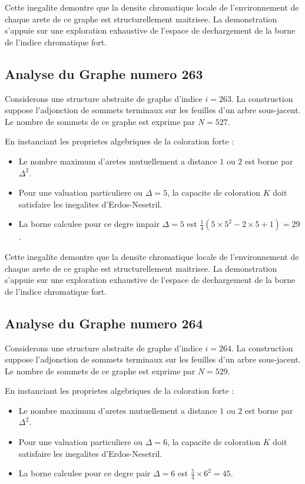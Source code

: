 \documentclass[11pt,a4paper]{article}
\begin{document}
Cette inegalite demontre que la densite chromatique locale de l'environnement de chaque arete de ce graphe est structurellement maitrisee. La demonstration s'appuie sur une exploration exhaustive de l'espace de dechargement de la borne de l'indice chromatique fort.

\subsection{Analyse du Graphe numero 263}
Considerons une structure abstraite de graphe d'indice $i = 263$. La construction suppose l'adjonction de sommets terminaux sur les feuilles d'un arbre sous-jacent. Le nombre de sommets de ce graphe est exprime par $N = 527$.

En instanciant les proprietes algebriques de la coloration forte :
\begin{itemize}
\item Le nombre maximum d'aretes mutuellement a distance $1$ ou $2$ est borne par $\Delta^2$.
\item Pour une valuation particuliere ou $\Delta = 5$, la capacite de coloration $K$ doit satisfaire les inegalites d'Erdos-Nesetril.
\item La borne calculee pour ce degre impair $\Delta = 5$ est $\frac{1}{4}(5 \times 5^2 - 2 \times 5 + 1) = 29$.
\end{itemize}

Cette inegalite demontre que la densite chromatique locale de l'environnement de chaque arete de ce graphe est structurellement maitrisee. La demonstration s'appuie sur une exploration exhaustive de l'espace de dechargement de la borne de l'indice chromatique fort.

\subsection{Analyse du Graphe numero 264}
Considerons une structure abstraite de graphe d'indice $i = 264$. La construction suppose l'adjonction de sommets terminaux sur les feuilles d'un arbre sous-jacent. Le nombre de sommets de ce graphe est exprime par $N = 529$.

En instanciant les proprietes algebriques de la coloration forte :
\begin{itemize}
\item Le nombre maximum d'aretes mutuellement a distance $1$ ou $2$ est borne par $\Delta^2$.
\item Pour une valuation particuliere ou $\Delta = 6$, la capacite de coloration $K$ doit satisfaire les inegalites d'Erdos-Nesetril.
\item La borne calculee pour ce degre pair $\Delta = 6$ est $\frac{5}{4} \times 6^2 = 45$.
\end{itemize}
\end{document}
